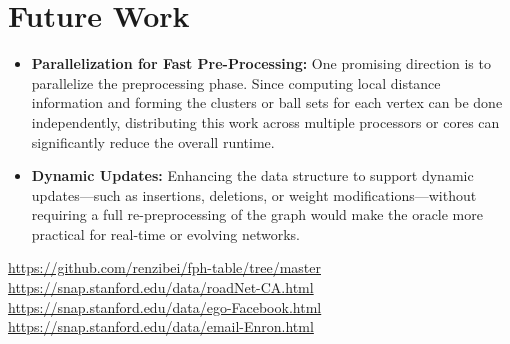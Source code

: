 \documentclass{article}
\begin{document}
\section{Future Work}

\begin{itemize}
    \item \textbf{Parallelization for Fast Pre-Processing:} One promising direction is to parallelize the preprocessing phase. Since computing local distance information and forming the clusters or ball sets for each vertex can be done independently, distributing this work across multiple processors or cores can significantly reduce the overall runtime.
    
    \item \textbf{Dynamic Updates:} Enhancing the data structure to support dynamic updates—such as insertions, deletions, or weight modifications—without requiring a full re-preprocessing of the graph would make the oracle more practical for real-time or evolving networks.
\end{itemize}

\begin{thebibliography}{9}
     \url{https://github.com/renzibei/fph-table/tree/master}
     \url{https://snap.stanford.edu/data/roadNet-CA.html}
     \url{https://snap.stanford.edu/data/ego-Facebook.html}
     \url{https://snap.stanford.edu/data/email-Enron.html}
    \end{thebibliography}
\end{document}

